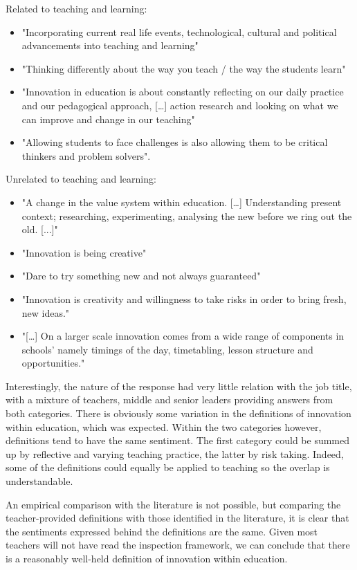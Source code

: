 Related to teaching and learning: 

\begin{itemize}
\item "Incorporating current real life events, technological, cultural and political advancements into teaching and learning"
\item "Thinking differently about the way you teach / the way the students learn"
\item "Innovation in education is about constantly reflecting on our daily practice and our pedagogical approach, […] action research and looking on what we can improve and change in our teaching"
\item "Allowing students to face challenges is also allowing them to be critical thinkers and problem solvers".
\end{itemize}

Unrelated to teaching and learning:
\begin{itemize}
\item "A change in the value system within education. […] Understanding present context; researching, experimenting, analysing the new before we ring out the old. [...]"
\item "Innovation is being creative"
\item "Dare to try something new and not always guaranteed"
\item "Innovation is creativity and willingness to take risks in order to bring fresh, new ideas."
\item "[…] On a larger scale innovation comes from a wide range of components in schools' namely timings of the day, timetabling, lesson structure and opportunities."
\end{itemize}

Interestingly, the nature of the response had very little relation with the job title, with a mixture of teachers, middle and senior leaders providing answers from both categories. There is obviously some variation in the definitions of innovation within education, which was expected. Within the two categories however, definitions tend to have the same sentiment. The first category could be summed up by reflective and varying teaching practice, the latter by risk taking. Indeed, some of the definitions could equally be applied to teaching so the overlap is understandable.

An empirical comparison with the literature is not possible, but comparing the teacher-provided definitions with those identified in the literature, it is clear that the sentiments expressed behind the definitions are the same. Given most teachers will not have read the inspection framework, we can conclude that there is a reasonably well-held definition of innovation within education.

